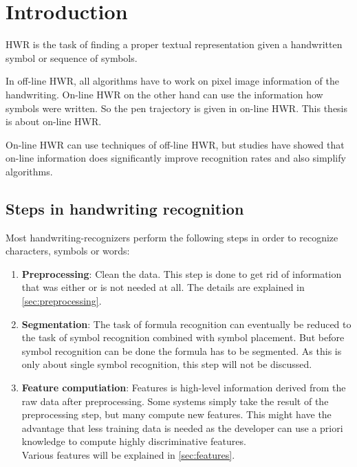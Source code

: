 \chapter{Introduction}\label{ch:Introduction}

\Gls{HWR} is the task of finding a proper textual representation
given a handwritten symbol or sequence of symbols.

In off-line \gls{HWR}, all algorithms have to work on pixel image
information of the handwriting. On-line \gls{HWR} on the other
hand can use the information how symbols were written. So the pen trajectory
is given in on-line \gls{HWR}.
This thesis is about on-line \gls{HWR}.

On-line \gls{HWR} can use techniques of off-line \gls{HWR}, but studies have
showed that on-line information does significantly improve recognition rates
and also simplify algorithms\cite{Guyon91,Becker72}.

\section{Steps in handwriting recognition}
Most handwriting-recognizers perform the following steps in order to recognize
characters, symbols or words:

\begin{enumerate}
    \item \textbf{Preprocessing}: Clean the data. This step is done to get rid
          of information that was either 
          or is not needed at all. The details are explained in
          \cref{sec:preprocessing}.
    \item \textbf{Segmentation}: The task of formula recognition can eventually
          be reduced to the task of symbol recognition combined with symbol
          placement. But before symbol recognition can be done the formula has
          to be segmented. As this 
          is only about single symbol recognition, this step will not be discussed.
    \item \textbf{Feature computiation}: Features is high-level information derived
          from the raw data after preprocessing. Some systems simply take the
          result of the preprocessing step, but many compute new features. This
          might have the advantage that less training data is needed as the
          developer can use a priori knowledge to compute highly discriminative
          features.\\
          Various features will be explained in \cref{sec:features}.
\end{enumerate}

